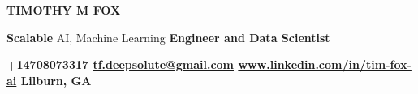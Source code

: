 \documentclass[10pt,letterpaper]{article}
\begin{document}
{\color{black}\fontsize{30}{34}\selectfont\bfseries TIMOTHY M FOX}\par
\vspace{4pt}
{\color{accent}\fontsize{14}{16}\selectfont
  \textbf{Scalable} AI, Machine Learning \textbf{Engineer and Data Scientist}}\par
\vspace{6pt}
{\small\bfseries\color{meta}%
  {\color{accent}\faPhone*}\hspace{4pt}+14708073317\hspace{12pt}
  {\color{accent}\faAt}\hspace{4pt}\href{mailto:tf.deepsolute@gmail.com}{tf.deepsolute@gmail.com}\hspace{12pt}
  {\color{accent}\faLink}\hspace{4pt}\href{https://www.linkedin.com/in/tim-fox-ai}{www.linkedin.com/in/tim-fox-ai}\hspace{12pt}
  {\color{accent}\faMapMarker*}\hspace{4pt}Lilburn, GA}\par
\vspace{2pt}
\end{document}
